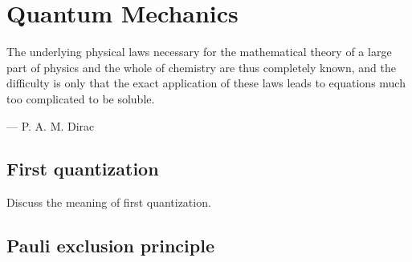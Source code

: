 \chapter{Quantum Mechanics}
    \epigraph{The underlying physical laws necessary for the mathematical
    theory of a large part of physics and the whole of chemistry are thus
    completely known, and the difficulty is only that the exact application of
    these laws leads to equations much too complicated to be soluble.}
    {--- P. A. M. Dirac}

    \section{First quantization}
        Discuss the meaning of first quantization.

    \section{Pauli exclusion principle}

